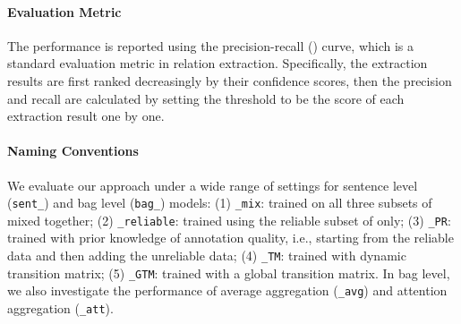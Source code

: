 \paragraph{Evaluation Metric}
The performance is reported using the precision-recall (\PR) curve,
which is a standard evaluation metric in relation extraction.
Specifically, the extraction results are first ranked decreasingly by their confidence scores, then the precision and recall are calculated by setting the threshold to be the score of each extraction result one by one.

\paragraph{Naming Conventions}
We evaluate our approach under a wide range of settings for
 sentence level
(\texttt{sent\_}) and bag level (\texttt{bag\_}) models:
(1) \texttt{\_mix}:  trained on all three subsets of \TimeRE mixed together;
(2) \texttt{\_reliable}:  trained using the reliable subset of \TimeRE only;
(3) \texttt{\_PR}:  trained with prior knowledge of annotation quality, i.e., starting from the reliable data and then adding the unreliable data;
(4) \texttt{\_TM}: trained with dynamic transition matrix;
(5) \texttt{\_GTM}:  trained with a global transition matrix.
%
%
In bag level, we also investigate the performance   %
of average aggregation (\texttt{\_avg})
and attention aggregation (\texttt{\_att}).



